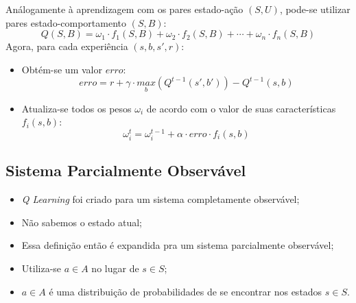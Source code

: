 \documentclass{beamer}
\begin{document}
\begin{frame}
Análogamente à aprendizagem com os pares estado-ação $ \left( S, U \right) $, pode-se utilizar pares estado-comportamento $ \left( S, B \right) $:
$$ Q \left( S, B \right) = \omega_1 \cdot f_1 \left( S, B \right) + \omega_2 \cdot f_2 \left( S, B \right) + \cdots + \omega_n \cdot f_n \left( S, B \right) $$\pause
Agora, para cada experiência $ \left( s, b, s', r \right) $:\pause
\begin{itemize}
	\item Obtém-se um valor $ erro $:
		$$ erro = r + \gamma \cdot \underset{b}{max} \left( Q^{t-1} \left( s', b' \right) \right) - Q^{t-1} \left( s, b \right) $$\pause
	\item Atualiza-se todos os pesos $ \omega_i $ de acordo com o valor de suas características $ f_i \left( s, b \right) $:
		$$ \omega_i^t = \omega_i^{t-1} + \alpha \cdot erro \cdot f_i \left( s, b \right) $$
\end{itemize}
\end{frame}


\subsection{Sistema Parcialmente Observável}

\begin{frame}
\begin{itemize}
	\item \textit{Q Learning} foi criado para um sistema completamente observável;\pause
	\item Não sabemos o estado atual;\pause
	\item Essa definição então é expandida pra um sistema parcialmente observável;\pause
	\item Utiliza-se $ a \in A $ no lugar de $ s \in S $;\pause
	\item $ a \in A $ é uma distribuição de probabilidades de se encontrar nos estados $ s \in S $.
\end{itemize}
\end{frame}

\end{document}
